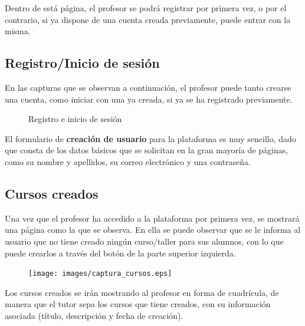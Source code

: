 Dentro de está página, el profesor se podrá registrar por primera vez, o por el contrario, si ya dispone de una cuenta creada previamente, puede entrar con la misma.


\subsection{Registro/Inicio de sesión}
\label{1:sec:2}

En las capturas que se observan a continuación, el profesor puede tanto crearse una cuenta, como iniciar con una ya creada, si ya se ha registrado previamente. 
\begin{figure}[!th]%
    \centering
    \qquad
    \caption{Registro e inicio de sesión}%
    \label{fig:12}%
\end{figure}

El formulario de \textbf{creación de usuario} para la plataforma es muy sencillo, dado que consta de los datos básicos que se solicitan en la gran mayoría de páginas, como su nombre y apellidos, su correo electrónico y una contraseña.


\subsection{Cursos creados}
\label{1:sec:3}

Una vez que el profesor ha accedido a la plataforma por primera vez, se mostrará una página como la que se observa. En ella se puede observar que se le informa al usuario que no tiene creado ningún curso/taller para sus alumnos, 
con lo que puede crearlos a través del botón de la parte superior izquierda.

\newpage
\begin{figure}[!th]
\begin{center}
\texttt{[image: images/captura\_cursos.eps]}
\label{fig:13}
\end{center}
\end{figure}

Los cursos creados se irán mostrando al profesor en forma de cuadrícula, de manera que el tutor sepa los cursos que tiene creados, con su información asociada (título, descripción y fecha de creación).

